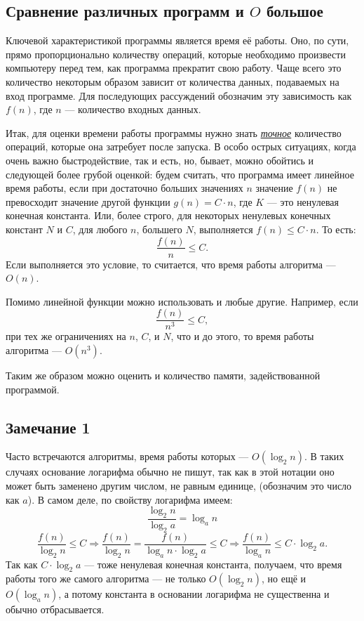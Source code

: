 \subsection{Сравнение различных программ и $O$ большое}
Ключевой характеристикой программы является время её работы. Оно, по сути, прямо пропорционально количеству операций, которые необходимо произвести компьютеру перед тем, как программа прекратит свою работу. Чаще всего это количество некоторым образом зависит от количества данных, подаваемых на вход программе. Для последующих рассуждений обозначим эту зависимость как $f(n)$, где $n$ --- количество входных данных.

Итак, для оценки времени работы программы нужно знать \underline{\emph{точное}} количество операций, которые она затребует после запуска. В особо острых ситуациях, когда очень важно быстродействие, так и есть, но, бывает, можно обойтись и следующей более грубой оценкой: будем считать, что программа имеет линейное время работы, если при достаточно больших значениях $n$ значение $f(n)$ не превосходит значение другой функции $g(n) = C \cdot n$, где $K$ --- это ненулевая конечная константа. Или, более строго, для некоторых ненулевых конечных констант $N$ и $C$, для любого $n$, большего $N$, выполняется $f(n) \le C \cdot n$.
То есть:
$$\frac{f(n)}{n} \le C.$$
Если выполняется это условие, то считается, что время работы алгоритма --- $O(n)$.

Помимо линейной функции можно использовать и любые другие. Например, если
$$\frac{f(n)}{n^3} \le C,$$
при тех же ограничениях на $n$, $C$, и $N$, что и до этого, то время работы алгоритма --- $O(n^3)$.

Таким же образом можно оценить и количество памяти, задействованной программой.

\subsection*{Замечание 1}
Часто встречаются алгоритмы, время работы которых --- $O(\log_2 n)$. В таких случаях основание логарифма обычно не пишут, так как в этой нотации оно может быть заменено другим числом, не равным единице, (обозначим это число как $a$). В самом деле, по свойству логарифма имеем:
$$\frac{\log_2 n}{\log_2 a} = \log_a n$$
$$\frac{f(n)}{\log_2 n} \le C \Rightarrow \frac{f(n)}{\log_2 n} = \frac{f(n)}{\log_a n \cdot \log_2 a} \le C \Rightarrow \frac{f(n)}{\log_a n} \le C \cdot \log_2 a.$$
Так как $C \cdot \log_2 a$ --- тоже ненулевая конечная константа, получаем, что время работы того же самого алгоритма --- не только $O(\log_2 n)$, но ещё и $O(\log_a n)$, а потому константа в основании логарифма не существенна и обычно отбрасывается.

